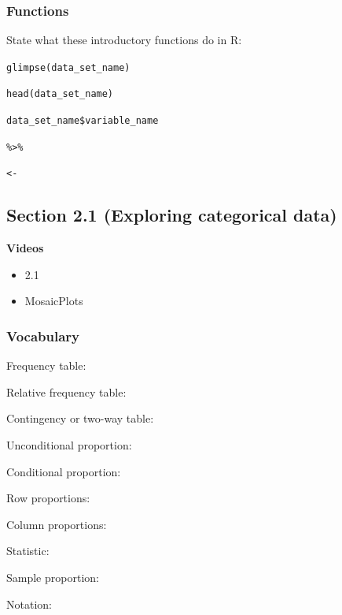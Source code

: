 \documentclass[
]{report}
\providecommand{\tightlist}{%
  \setlength{\itemsep}{0pt}\setlength{\parskip}{0pt}}
\newcommand{\rgs}{\vspace{12pt}} %
\newcommand{\rgi}{\hspace{24pt}}  %
\begin{document}
\hypertarget{functions}{%
\subsubsection*{Functions}\label{functions}}

State what these introductory functions do in R:

\texttt{glimpse(data\_set\_name)}

\texttt{head(data\_set\_name)}

\texttt{data\_set\_name\$variable\_name}

\texttt{\%\textgreater{}\%}

\texttt{\textless{}-}

\hypertarget{section-2.1-exploring-categorical-data}{%
\subsection*{Section 2.1 (Exploring categorical data)}\label{section-2.1-exploring-categorical-data}}


\textbf{Videos}

\begin{itemize}
\tightlist
\item
  2.1
\item
  MosaicPlots
\end{itemize}


\hypertarget{vocabulary-3}{%
\subsubsection*{Vocabulary}\label{vocabulary-3}}

Frequency table:
\rgs

Relative frequency table:
\rgs

Contingency or two-way table:
\rgs

Unconditional proportion:
\rgs

Conditional proportion:
\rgs

\rgi Row proportions:
\rgs

\rgi Column proportions:
\rgs

Statistic:
\rgs

\rgi Sample proportion:
\rgs

\rgi \rgi Notation:
\rgs
\end{document}
